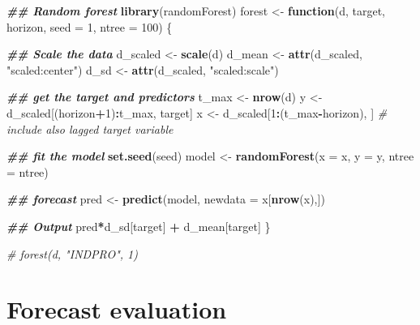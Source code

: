 \documentclass[
]{book}
\newenvironment{Shaded}{\begin{snugshade}}{\end{snugshade}}
\newcommand{\AttributeTok}[1]{\textcolor[rgb]{0.13,0.29,0.53}{#1}}
\newcommand{\CommentTok}[1]{\textcolor[rgb]{0.56,0.35,0.01}{\textit{#1}}}
\newcommand{\ControlFlowTok}[1]{\textcolor[rgb]{0.13,0.29,0.53}{\textbf{#1}}}
\newcommand{\DecValTok}[1]{\textcolor[rgb]{0.00,0.00,0.81}{#1}}
\newcommand{\DocumentationTok}[1]{\textcolor[rgb]{0.56,0.35,0.01}{\textbf{\textit{#1}}}}
\newcommand{\FunctionTok}[1]{\textcolor[rgb]{0.13,0.29,0.53}{\textbf{#1}}}
\newcommand{\NormalTok}[1]{#1}
\newcommand{\OtherTok}[1]{\textcolor[rgb]{0.56,0.35,0.01}{#1}}
\newcommand{\SpecialCharTok}[1]{\textcolor[rgb]{0.81,0.36,0.00}{\textbf{#1}}}
\newcommand{\StringTok}[1]{\textcolor[rgb]{0.31,0.60,0.02}{#1}}
\begin{document}
\begin{Shaded}
\begin{Highlighting}[]
\DocumentationTok{\#\# Random forest}
\FunctionTok{library}\NormalTok{(randomForest)}
\NormalTok{forest }\OtherTok{\textless{}{-}} \ControlFlowTok{function}\NormalTok{(d, target, horizon, }\AttributeTok{seed =} \DecValTok{1}\NormalTok{, }\AttributeTok{ntree =} \DecValTok{100}\NormalTok{) \{}
  
  \DocumentationTok{\#\# Scale the data}
\NormalTok{  d\_scaled }\OtherTok{\textless{}{-}} \FunctionTok{scale}\NormalTok{(d)}
\NormalTok{  d\_mean }\OtherTok{\textless{}{-}} \FunctionTok{attr}\NormalTok{(d\_scaled, }\StringTok{"scaled:center"}\NormalTok{)}
\NormalTok{  d\_sd }\OtherTok{\textless{}{-}} \FunctionTok{attr}\NormalTok{(d\_scaled, }\StringTok{"scaled:scale"}\NormalTok{)}
  
  \DocumentationTok{\#\# get the target and predictors}
\NormalTok{  t\_max }\OtherTok{\textless{}{-}} \FunctionTok{nrow}\NormalTok{(d)}
\NormalTok{  y }\OtherTok{\textless{}{-}}\NormalTok{ d\_scaled[(horizon}\SpecialCharTok{+}\DecValTok{1}\NormalTok{)}\SpecialCharTok{:}\NormalTok{t\_max, target]   }
\NormalTok{  x }\OtherTok{\textless{}{-}}\NormalTok{ d\_scaled[}\DecValTok{1}\SpecialCharTok{:}\NormalTok{(t\_max}\SpecialCharTok{{-}}\NormalTok{horizon), ] }\CommentTok{\# include also lagged target variable}
  
  \DocumentationTok{\#\# fit the model}
  \FunctionTok{set.seed}\NormalTok{(seed)}
\NormalTok{  model }\OtherTok{\textless{}{-}} \FunctionTok{randomForest}\NormalTok{(}\AttributeTok{x =}\NormalTok{ x, }\AttributeTok{y =}\NormalTok{ y, }\AttributeTok{ntree =}\NormalTok{ ntree)}
  
  \DocumentationTok{\#\# forecast}
\NormalTok{  pred }\OtherTok{\textless{}{-}} \FunctionTok{predict}\NormalTok{(model, }\AttributeTok{newdata =}\NormalTok{ x[}\FunctionTok{nrow}\NormalTok{(x),])}

  \DocumentationTok{\#\# Output}
\NormalTok{  pred}\SpecialCharTok{*}\NormalTok{d\_sd[target] }\SpecialCharTok{+}\NormalTok{ d\_mean[target]}
\NormalTok{\}}

\CommentTok{\# forest(d, "INDPRO", 1)}
\end{Highlighting}
\end{Shaded}

\hypertarget{forecast-evaluation}{%
\section{Forecast evaluation}\label{forecast-evaluation}}
\end{document}

